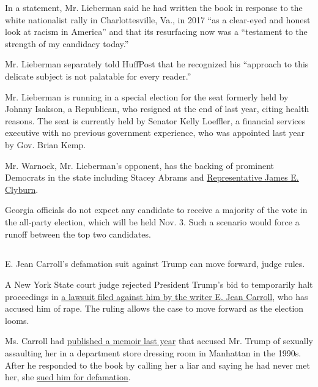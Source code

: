 In a statement, Mr. Lieberman said he had written the book in response
to the white nationalist rally in Charlottesville, Va., in 2017 ``as a
clear-eyed and honest look at racism in America'' and that its
resurfacing now was a ``testament to the strength of my candidacy
today.''

Mr. Lieberman separately told HuffPost that he recognized his ``approach
to this delicate subject is not palatable for every reader.''

Mr. Lieberman is running in a special election for the seat formerly
held by Johnny Isakson, a Republican, who resigned at the end of last
year, citing health reasons. The seat is currently held by Senator Kelly
Loeffler, a financial services executive with no previous government
experience, who was appointed last year by Gov. Brian Kemp.

Mr. Warnock, Mr. Lieberman's opponent, has the backing of prominent
Democrats in the state including Stacey Abrams and
\href{https://www.ajc.com/blog/politics/georgia-senate-warnock-wins-clyburn-endorsement/6lcWvKZ34cxFHqIvCpGDYL/}{Representative
James E. Clyburn}.

Georgia officials do not expect any candidate to receive a majority of
the vote in the all-party election, which will be held Nov. 3. Such a
scenario would force a runoff between the top two candidates.

\hypertarget{-10}{%
\subsection{}\label{-10}}

E. Jean Carroll's defamation suit against Trump can move forward, judge
rules.

A New York State court judge rejected President Trump's bid to
temporarily halt proceedings in
\href{https://www.nytimes3xbfgragh.onion/2020/08/07/nyregion/jean-caroll-donald-trump-lawsuit-rape.html}{a
lawsuit filed against him by the writer E. Jean Carroll}, who has
accused him of rape. The ruling allows the case to move forward as the
election looms.

Ms. Carroll had
\href{https://www.nytimes3xbfgragh.onion/2019/06/21/books/e-jean-carroll-trump.html}{published
a memoir last year} that accused Mr. Trump of sexually assaulting her in
a department store dressing room in Manhattan in the 1990s. After he
responded to the book by calling her a liar and saying he had never met
her, she
\href{https://www.nytimes3xbfgragh.onion/2019/11/04/nyregion/jean-carroll-sues-trump.html}{sued
him for defamation}.

